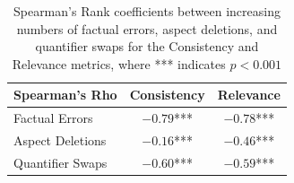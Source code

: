 \begin{table}[h!]
\centering
\caption{Spearman's Rank coefficients between increasing numbers of factual errors, aspect deletions, and quantifier swaps for the Consistency and Relevance metrics, where *** indicates $p < 0.001$}
\label{tab:spearman}
\begin{tabular}{lcc}
\toprule
\textbf{Spearman's Rho} & \textbf{Consistency} & \textbf{Relevance} \\
\midrule
Factual Errors & $-0.79$*** & $-0.78$*** \\
Aspect Deletions & $-0.16$*** & $-0.46$*** \\
Quantifier Swaps & $-0.60$*** & $-0.59$*** \\
\bottomrule
\end{tabular}
\end{table}
